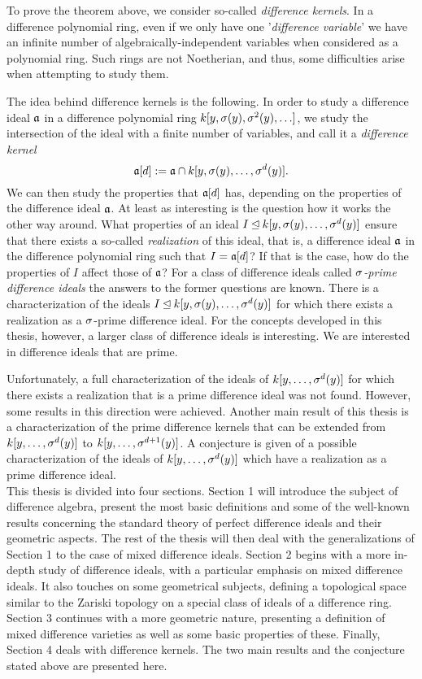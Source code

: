 To prove the theorem above, we consider so-called \emph{difference kernels}.
In a difference polynomial ring, even if we only have one '\emph{difference variable}' we have an infinite number of algebraically-independent variables when considered as a polynomial ring. Such rings are not Noetherian, and thus, some difficulties arise when attempting to study them. 

The idea behind difference kernels is the following.
In order to study a difference ideal $\mathfrak{a}$ in a difference polynomial ring $k[y,\sigma(y),\sigma^2(y),\ldots]$,
we study the intersection of the ideal with a finite number of variables, and call it a \emph{difference kernel} $$\mathfrak{a}[d] := \mathfrak{a} \cap k[y,\sigma(y),\ldots,\sigma^d(y)].$$
We can then study the properties that $\mathfrak{a}[d]$ has, depending on the properties of the difference ideal $\mathfrak{a}$. At least as interesting is the question how it works the other way around.
What properties of an ideal $I \unlhd k[y,\sigma(y),\ldots,\sigma^d(y)]$ ensure that there exists a so-called \emph{realization} of this ideal, that is, a difference ideal $\mathfrak{a}$ in the difference polynomial ring such that $I = \mathfrak{a}[d]$?
 If that is the case, how do the properties of $I$ affect those of $\mathfrak{a}$?
For a class of difference ideals called \emph{$\sigma$-prime difference ideals} the answers to the former questions are known. 
There is a characterization of the ideals $I \unlhd k[y,\sigma(y),\ldots,\sigma^d(y)]$ for which there exists a realization as a $\sigma$-prime difference ideal. 
For the concepts developed in this thesis, however, a larger class of difference ideals is interesting. We are interested in difference ideals that are prime. 

Unfortunately, a full characterization of the ideals of $k[y,\ldots,\sigma^d(y)]$ for which there exists a realization that is a prime difference ideal was not found. However, some results in this direction were achieved. Another main result of this thesis is a characterization of the prime difference kernels that 
can be extended from $k[y,\ldots,\sigma^d(y)]$ to $k[y,\ldots,\sigma^{d+1}(y)]$. A conjecture is given of a possible characterization of the ideals of $k[y,\ldots,\sigma^d(y)]$
which have a realization as a prime difference ideal. \\


This thesis is divided into four sections. Section 1 will introduce the subject of difference algebra, present the most basic definitions and some of the well-known results concerning the standard theory of perfect difference ideals and their geometric aspects.
The rest of the thesis will then deal with the generalizations  of Section 1 to the case of mixed difference ideals.
Section 2 begins with a more in-depth study of difference ideals, with a particular emphasis on mixed difference ideals. It also touches on some geometrical subjects, defining a topological space similar to the Zariski topology on a special class of ideals of a difference ring.
Section 3 continues with a more geometric nature, presenting a definition of mixed difference varieties as well as some basic properties of these. 
Finally, Section 4 deals with difference kernels. The two main results and the conjecture stated above are presented here.
